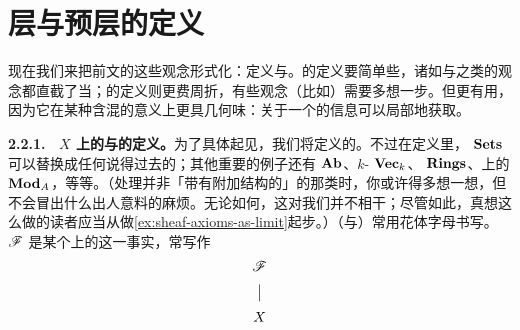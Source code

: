 
\section{层与预层的定义}

现在我们来把前文的这些观念形式化：定义\trPresheaf{}与\trSheaf。\trPresheaf{}的定义要简单些，诸如\trKernel{}与\trCokernel{}之类的观念都直截了当；\trSheaf{}的定义则更费周折，有些观念（比如\trCokernel）需要多想一步。但\trSheaf{}更有用，因为它在某种含混的意义上更具几何味：关于一个\trSheaf{}的信息可以局部地获取。

\textbf{2.2.1.\ \trTopologicalSpace{} $X$ 上的\trSheaf{}与\trPresheaf{}的定义。}\quad 为了具体起见，我们将定义\trSetsWord{}的\trSheaf。不过在定义里，\trCategory{} $\mathbf{Sets}$ 可以替换成任何说得过去的\trCategory；其他重要的例子还有\trAbelianGroups{} $\mathbf{Ab}$、$k$-\trVectorSpace{} $\mathbf{Vec}_k$、\trRing{} $\mathbf{Rings}$、\trRing{}上的\trModule{} $\mathbf{Mod}_{A}$，等等。（处理\trObject{}并非「带有附加结构的\trSet」的那类\trCategory{}时，你或许得多想一想，但不会冒出什么出人意料的麻烦。无论如何，这对我们并不相干；尽管如此，真想这么做的读者应当从做\cref{ex:sheaf-axioms-as-limit}起步。）\trSheaf{}（与\trPresheaf）常用花体字母书写。$\mathscr{F}$ 是某个\trTopologicalSpace{}上的\trSheaf{}这一事实，常写作
\[
\begin{array}{c}
\mathscr{F}\\[6pt]
\big\vert\\[6pt]
X
\end{array}
\]

